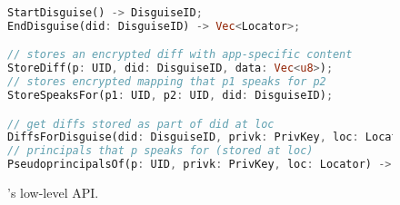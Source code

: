 \begin{figure}[t]
\begin{lstlisting}[language=Rust, style=rust]
StartDisguise() -> DisguiseID;
EndDisguise(did: DisguiseID) -> Vec<Locator>;

// stores an encrypted diff with app-specific content
StoreDiff(p: UID, did: DisguiseID, data: Vec<u8>);
// stores encrypted mapping that p1 speaks for p2
StoreSpeaksFor(p1: UID, p2: UID, did: DisguiseID);

// get diffs stored as part of did at loc
DiffsForDisguise(did: DisguiseID, privk: PrivKey, loc: Locator) -> Vec<Vec<u8>>;
// principals that p speaks for (stored at loc)
PseudoprincipalsOf(p: UID, privk: PrivKey, loc: Locator) -> Vec<UID>;
\end{lstlisting}
\caption{\sys's low-level API.}
\label{f:api-low}
\end{figure}



